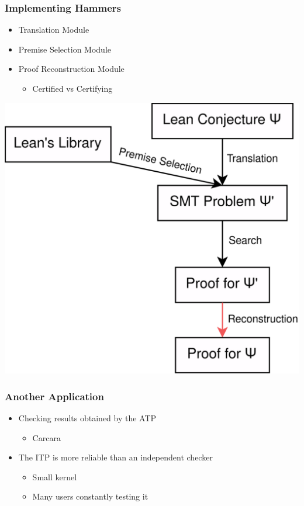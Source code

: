 \documentclass[usepdftitle=false,aspectratio=169,usenames,dvipsnames]{beamer}
\newcommand\vitem{\vfill\item}
\begin{document}
\begin{frame}
  \frametitle{Implementing Hammers}
  \begin{minipage}[c][0.55 \textheight]{0.45 \textwidth}
    \begin{itemize}
      \item Translation Module
      \vitem Premise Selection Module
      \vitem Proof Reconstruction Module
      \begin{itemize}
        \item{Certified vs Certifying}
      \end{itemize}
    \end{itemize}
  \end{minipage}
  \begin{minipage}{0.44 \textwidth}
    \centering
    \includegraphics[height=0.65\textheight]{images/pic5.png}
  \end{minipage}
\end{frame}


\begin{frame}
  \frametitle{Another Application}
  \begin{itemize}
    \item Checking results obtained by the ATP
    \begin{itemize}
      \item Carcara
    \end{itemize}
    \vitem The ITP is more reliable than an independent checker
    \begin{itemize}
      \item Small kernel
      \item Many users constantly testing it
    \end{itemize}
  \end{itemize}
\end{frame}
\end{document}
